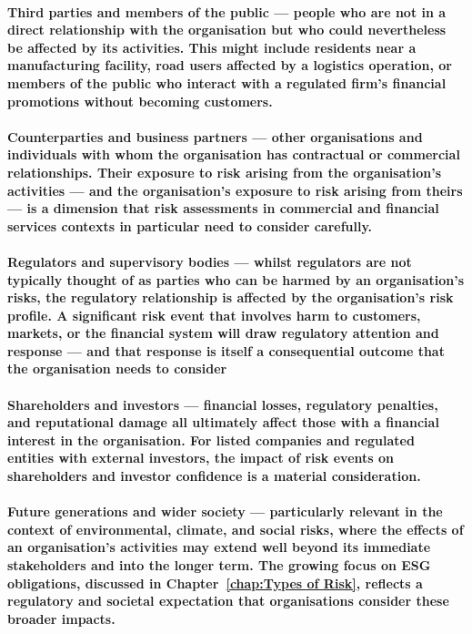 \paragraph{\textbf{Third parties and members of the public} — people who are not in a direct relationship with the organisation but who could nevertheless be affected by its activities. This might include residents near a manufacturing facility, road users affected by a logistics operation, or members of the public who interact with a regulated firm's financial promotions without becoming customers.}
\paragraph{\textbf{Counterparties and business partners} — other organisations and individuals with whom the organisation has contractual or commercial relationships. Their exposure to risk arising from the organisation's activities — and the organisation's exposure to risk arising from theirs — is a dimension that risk assessments in commercial and financial services contexts in particular need to consider carefully.}
\paragraph{\textbf{Regulators and supervisory bodies} — whilst regulators are not typically thought of as parties who can be harmed by an organisation's risks, the regulatory relationship is affected by the organisation's risk profile. A significant risk event that involves harm to customers, markets, or the financial system will draw regulatory attention and response — and that response is itself a consequential outcome that the organisation needs to consider}
\paragraph{\textbf{Shareholders and investors} — financial losses, regulatory penalties, and reputational damage all ultimately affect those with a financial interest in the organisation. For listed companies and regulated entities with external investors, the impact of risk events on shareholders and investor confidence is a material consideration.}
\paragraph{\textbf{Future generations and wider society} — particularly relevant in the context of environmental, climate, and social risks, where the effects of an organisation's activities may extend well beyond its immediate stakeholders and into the longer term. The growing focus on ESG obligations, discussed in Chapter~\ref{chap:Types of Risk}, reflects a regulatory and societal expectation that organisations consider these broader impacts.}

